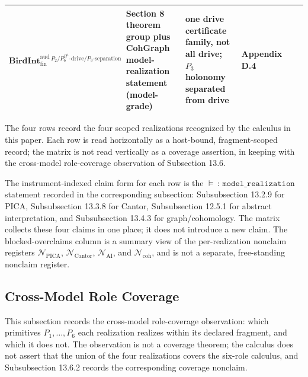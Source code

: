 \documentclass[11pt]{article}
\theoremstyle{definition}
\begin{document}
\begin{longtable}[]{@{}llllll@{}}
\begin{minipage}[t]{0.22\columnwidth}
\(\mathbf{BirdInt}^{\mathrm{aud}}_{\mathrm{fin}}{}^{\,P_{2}/P_{6}^{H^{1}}\text{-drive}/P_{3}\text{-separation}}\)\strut
\end{minipage} & \begin{minipage}[t]{0.12\columnwidth}\raggedright
Section 8 theorem group plus CohGraph model-realization statement (model-grade)\strut
\end{minipage} & \begin{minipage}[t]{0.22\columnwidth}\raggedright
one drive certificate family, not all drive; \(P_{3}\) holonomy separated from drive\strut
\end{minipage} & \begin{minipage}[t]{0.08\columnwidth}\raggedright
Appendix D.4\strut
\end{minipage}\tabularnewline
\bottomrule
\end{longtable}

The four rows record the four scoped realizations recognized by the calculus in this paper. Each row is read horizontally as a host-bound, fragment-scoped record; the matrix is not read vertically as a coverage assertion, in keeping with the cross-model role-coverage observation of Subsection 13.6.

The instrument-indexed claim form for each row is the \(\models\,:\,\texttt{model\_realization}\) statement recorded in the corresponding subsection: Subsubsection 13.2.9 for PICA, Subsubsection 13.3.8 for Cantor, Subsubsection 12.5.1 for abstract interpretation, and Subsubsection 13.4.3 for graph/cohomology. The matrix collects these four claims in one place; it does not introduce a new claim. The blocked-overclaims column is a summary view of the per-realization nonclaim registers \(\mathcal N_{\mathrm{PICA}}\), \(\mathcal N_{\mathrm{Cantor}}\), \(\mathcal N_{\mathrm{AI}}\), and \(\mathcal N_{\mathrm{coh}}\), and is not a separate, free-standing nonclaim register.

\subsection{Cross-Model Role Coverage}

This subsection records the cross-model role-coverage observation: which primitives \(P_{1},\ldots,P_{6}\) each realization realizes within its declared fragment, and which it does not. The observation is not a coverage theorem; the calculus does not assert that the union of the four realizations covers the six-role calculus, and Subsubsection 13.6.2 records the corresponding coverage nonclaim.
\end{document}
